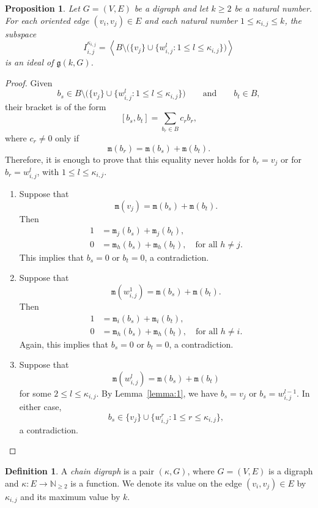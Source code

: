 \documentclass[a4paper,11pt]{amsart}
\newtheorem{proposition}[theorem]{Proposition}
\theoremstyle{definition}
\newtheorem{definition}[theorem]{Definition}
\theoremstyle{remark}
\numberwithin{equation}{section}
\newcommand{\g}{\mathfrak{g}}
\newcommand{\N}{\mathbb{N}}
\newcommand{\mult}{\mathtt{m}}
\begin{document}
\begin{proposition}
Let $G=(V,E)$ be a digraph and let $k\ge 2$ be a natural number. 
For each oriented edge $(v_i,v_j)\in E$ and each natural number $1\leq \kappa_{i,j}\leq k$, the subspace
\[
I_{i,j}^{\kappa_{i,j}}=
\left\langle B\setminus\big(\{v_j\}\cup\{w_{i,j}^l: 1\leq l\leq \kappa_{i,j}\}\big)\right\rangle
\]
is an ideal of $\g(k,G)$.
\end{proposition}

\begin{proof}
Given
\[
b_s\in B\setminus\big(\{v_j\}\cup\{w_{i,j}^l: 1\leq l\leq \kappa_{i,j}\}\big)
\qquad\text{and}\qquad
b_t\in B,
\]
their bracket is of the form
\[
[b_s,b_t]=\sum_{b_r\in B} c_r b_r,
\]
where $c_r\ne 0$ only if
\[
\mult(b_r)= \mult(b_s)+\mult(b_t).
\]
Therefore, it is enough to prove that this equality never holds for $b_r=v_j$ or for $b_r=w_{i,j}^l$, with $1\leq l\leq \kappa_{i,j}$.

\begin{enumerate}
\item Suppose that
\[
\mult(v_j)=\mult(b_s)+\mult(b_t).
\]
Then
\begin{align*}
1&=\mult_j(b_s)+\mult_j(b_t),\\
0&=\mult_h(b_s)+\mult_h(b_t), \quad \text{for all } h\neq j.
\end{align*}
This implies that $b_s=0$ or $b_t=0$, a contradiction.

\item Suppose that
\[
\mult(w_{i,j}^1)=\mult(b_s)+\mult(b_t).
\]
Then
\begin{align*}
1&=\mult_i(b_s)+\mult_i(b_t),\\
0&=\mult_h(b_s)+\mult_h(b_t), \quad \text{for all } h\neq i.
\end{align*}
Again, this implies that $b_s=0$ or $b_t=0$, a contradiction.

\item Suppose that
\[
\mult(w_{i,j}^l)=\mult(b_s)+\mult(b_t)
\]
for some $2\leq l\leq \kappa_{i,j}$. By Lemma~\ref{lemma:1}, we have $b_s=v_j$ or $b_s=w_{i,j}^{l-1}$. In either case,
\[
b_s\in \{v_j\}\cup\{w_{i,j}^r: 1\leq r\leq \kappa_{i,j}\},
\]
a contradiction.
\end{enumerate}
\end{proof}

\begin{definition}
A \emph{chain digraph} is a pair \((\kappa,G)\), where \(G=(V,E)\) is a digraph and $\kappa:E\rightarrow \N_{\geq 2}$ is a function. 
We denote its value on the edge $(v_i,v_j)\in E$ by $\kappa_{i,j}$ and its maximum value by $k$. 
\end{definition}
\end{document}
